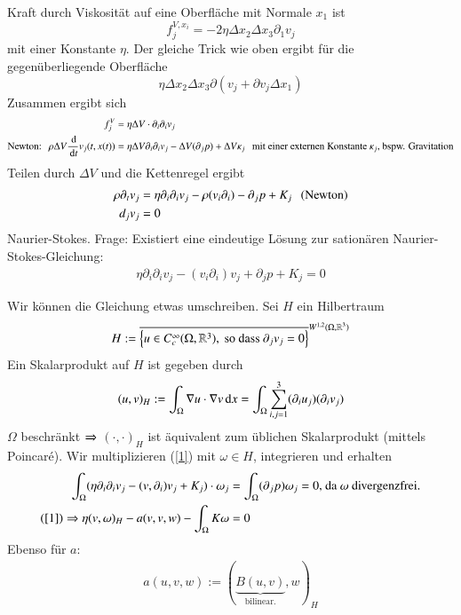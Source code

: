 \begin{description}
Kraft durch Viskosität auf eine Oberfläche mit Normale $x_1$ ist 
\[
    f_j^{V,x_i}= -2\eta \Delta x_2\Delta x_3 \partial_1v_j
\]
mit einer Konstante $\eta$. Der gleiche Trick wie oben ergibt für die gegenüberliegende
Oberfläche
\[
    \eta \Delta x_2 \Delta x_3 \partial (v_j+\partial v_j\Delta x_1)
\]
Zusammen ergibt sich
\begin{align*}
    f_j^V&= \eta\Delta V \cdot \partial_i\partial_iv_j\\
    \text{Newton:} \hspace{.25cm} \rho \Delta V \frac{\, \mathrm{d}}{\, \mathrm{d} t} v_j (t,x(t))
        &= \eta \Delta V  \partial _i\partial_iv_j- \Delta V (\partial _j p) + \Delta 
        V\kappa_j \hspace{.25cm} \text{mit einer externen Konstante $\kappa_j$, bspw. Gravitation}
\end{align*}
Teilen durch $\Delta V$ und die Kettenregel ergibt
\begin{align*}
    \rho \partial_t v_j&= \eta \partial_i\partial_i v_j - \rho (v_i\partial_i) - \partial_j p + K_j 
        \hspace{.25cm} \text{(Newton)}\\
    d_jv_j&=0
\end{align*}
Naurier-Stokes. Frage: Existiert eine eindeutige Lösung zur sationären Naurier-Stokes-Gleichung:
\begin{align}\label{1}
    \eta \partial_i\partial_iv_j-(v_i\partial_i)v_j+\partial_jp+K_j=0
\end{align}
\end{description}
Wir können die Gleichung etwas umschreiben. Sei $H$ ein Hilbertraum
\[
    H:=\overline{\left\{ u\in C^\infty_c (\Omega,\mathbb{R}^3), \text{ so dass } \partial_jv_j=0 \right\}}
        ^{W^{1,2}(\Omega, \mathbb{R}^3)}
\]
Ein Skalarprodukt auf $H$ ist gegeben durch
\begin{align*}
    (u,v)_H:= \int_{\Omega} \nabla u\cdot \nabla v \, \mathrm{d} x = \int_\Omega \sum_{i,j=1}^3 
    (\partial_iu_j)(\partial_iv_j)
\end{align*}
$\Omega$ beschränkt $\Rightarrow$ $(\cdot, \cdot)_H$ ist äquivalent zum üblichen Skalarprodukt 
(mittels Poincaré).
Wir multiplizieren (\ref{1}) mit $\omega \in H $, integrieren und erhalten
\begin{align*}
    \int_\Omega (\eta \partial_i\partial_i v_j- (v,\partial_i) v_j + K_j) \cdot \omega_j 
    &= \int_\Omega (\partial _jp)\omega_j=0 \text{, da $\omega$ divergenzfrei.}\\
    (\ref{1}) \Rightarrow \eta (v,\omega)_H-a(v,v,w)-\int_\Omega K\omega&=0
\end{align*}
Ebenso für $a$:
\begin{align*}
    a(u,v,w):= (\underbrace{B(u,v)}_{\text{bilinear.}},w)_H
\end{align*}
